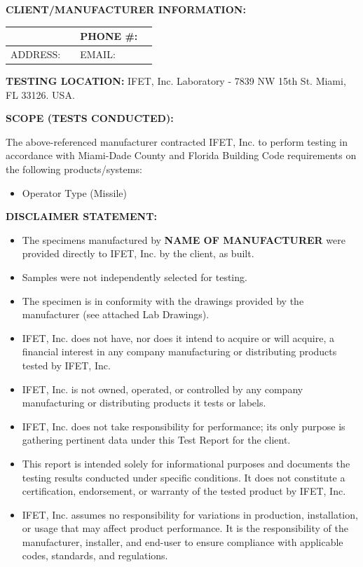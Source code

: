 \textbf{CLIENT/MANUFACTURER INFORMATION:}

\begin{longtable}[]{@{}llll@{}}
\toprule
{} & & PHONE \#: &\tabularnewline
\midrule
\endhead
ADDRESS: & & EMAIL: &\tabularnewline
\bottomrule
\end{longtable}

\textbf{TESTING LOCATION:} IFET, Inc. Laboratory - 7839 NW 15th St.
Miami, FL 33126. USA.

\textbf{SCOPE (TESTS CONDUCTED):}

The above-referenced manufacturer contracted IFET, Inc. to perform
testing in accordance with Miami-Dade County and Florida Building Code
requirements on the following products/systems:

\begin{itemize}
\item
  Operator Type (Missile)
\end{itemize}

\textbf{DISCLAIMER STATEMENT:}

\begin{itemize}
\item
  The specimens manufactured by \textbf{{NAME OF MANUFACTURER}} were
  provided directly to IFET, Inc. by the client, as built.
\item
  Samples were not independently selected for testing.
\item
  The specimen is in conformity with the drawings provided by the
  manufacturer (see attached Lab Drawings).
\item
  IFET, Inc. does not have, nor does it intend to acquire or will
  acquire, a financial interest in any company manufacturing or
  distributing products tested by IFET, Inc.
\item
  IFET, Inc. is not owned, operated, or controlled by any company
  manufacturing or distributing products it tests or labels.
\item
  IFET, Inc. does not take responsibility for performance; its only
  purpose is gathering pertinent data under this Test Report for the
  client.
\item
  This report is intended solely for informational purposes and
  documents the testing results conducted under specific conditions. It
  does not constitute a certification, endorsement, or warranty of the
  tested product by IFET, Inc.
\item
  IFET, Inc. assumes no responsibility for variations in production,
  installation, or usage that may affect product performance. It is the
  responsibility of the manufacturer, installer, and end-user to ensure
  compliance with applicable codes, standards, and regulations.
\end{itemize}

